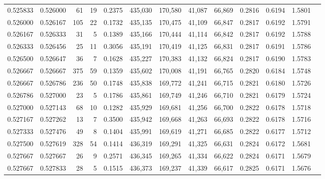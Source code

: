 \begin{tabular}{rrrrrrrrrrrrr}
0.525833 & 0.526000 &    61 &  19 &                                     0.2375 & 435,030 & 170,580 &  41,087 &  66,869 & 0.2816 & 0.6194 & 1.5801 \\
0.526000 & 0.526167 &   105 &  22 &                                     0.1732 & 435,135 & 170,475 &  41,109 &  66,847 & 0.2817 & 0.6192 & 1.5791 \\
0.526167 & 0.526333 &    31 &   5 &                                     0.1389 & 435,166 & 170,444 &  41,114 &  66,842 & 0.2817 & 0.6192 & 1.5788 \\
0.526333 & 0.526456 &    25 &  11 &                                     0.3056 & 435,191 & 170,419 &  41,125 &  66,831 & 0.2817 & 0.6191 & 1.5786 \\
0.526500 & 0.526647 &    36 &   7 &                                     0.1628 & 435,227 & 170,383 &  41,132 &  66,824 & 0.2817 & 0.6190 & 1.5783 \\
0.526667 & 0.526667 &   375 &  59 &                                     0.1359 & 435,602 & 170,008 &  41,191 &  66,765 & 0.2820 & 0.6184 & 1.5748 \\
0.526667 & 0.526786 &   236 &  50 &                                     0.1748 & 435,838 & 169,772 &  41,241 &  66,715 & 0.2821 & 0.6180 & 1.5726 \\
0.526786 & 0.527000 &    23 &   5 &                                     0.1786 & 435,861 & 169,749 &  41,246 &  66,710 & 0.2821 & 0.6179 & 1.5724 \\
0.527000 & 0.527143 &    68 &  10 &                                     0.1282 & 435,929 & 169,681 &  41,256 &  66,700 & 0.2822 & 0.6178 & 1.5718 \\
0.527167 & 0.527262 &    13 &   7 &                                     0.3500 & 435,942 & 169,668 &  41,263 &  66,693 & 0.2822 & 0.6178 & 1.5716 \\
0.527333 & 0.527476 &    49 &   8 &                                     0.1404 & 435,991 & 169,619 &  41,271 &  66,685 & 0.2822 & 0.6177 & 1.5712 \\
0.527500 & 0.527619 &   328 &  54 &                                     0.1414 & 436,319 & 169,291 &  41,325 &  66,631 & 0.2824 & 0.6172 & 1.5681 \\
0.527667 & 0.527667 &    26 &   9 &                                     0.2571 & 436,345 & 169,265 &  41,334 &  66,622 & 0.2824 & 0.6171 & 1.5679 \\
0.527667 & 0.527833 &    28 &   5 &                                     0.1515 & 436,373 & 169,237 &  41,339 &  66,617 & 0.2825 & 0.6171 & 1.5676 \\

\end{tabular}
